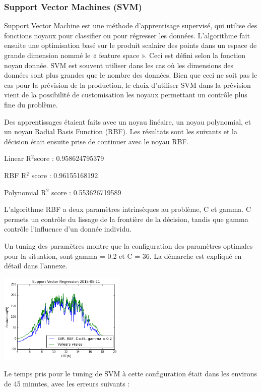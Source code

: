 \documentclass[a4paper]{article}
\begin{document}
\begin{multicols}{2}
\subsubsection{Support Vector Machines (SVM)}

Support Vector Machine  est une méthode d’apprentisage supervisé, qui utilise des fonctions noyaux pour classifier ou pour régresser les données. L’algorithme fait ensuite une optimisation basé sur le produit scalaire des points dans un espace de grande dimension nommé le « feature space ». Ceci est défini selon la fonction noyau donnée. SVM est souvent utiliser dans les cas où les dimensions des données sont plus grandes que le nombre des données. Bien que ceci ne soit pas le cas pour la prévision de la production, le choix d’utiliser SVM dans la prévision vient de la possibilité de customisation les noyaux permettant un contrôle plus fine du problème. 

Des apprentissages étaient faits avec un noyau linéaire, un noyau polynomial, et un noyau Radial Basis Function (RBF). Les résultats sont les suivants et la décision était ensuite prise de continuer avec le noyau RBF. 

Linear R$^{2} $score : 0.958624795379

RBF R$^{2}$ score : 0.96155168192

Polynomial R$^{2}$ score : 0.553626719589

L'algorithme RBF a deux paramètres intrinsèques au problème, C et gamma. C permets un contrôle du lissage de la frontière de la décision, tandis que gamma contrôle l’influence d’un donnée individu. 

Un tuning des paramètres montre que la configuration des paramètres optimales pour la situation, sont gamma = 0.2 et C = 36. La démarche est expliqué en détail dans l'annexe. 

\includegraphics[width=0.45\textwidth]{./images/11maysvm.png}

Le temps pris pour le tuning de SVM à cette configuration était dans les environs de 45 minutes, avec les erreurs suivants : 


\end{multicols}
\end{document}
